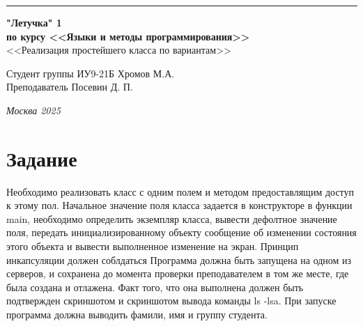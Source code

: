 \documentclass[a4paper, 14pt]{extarticle}
\begin{document}
\begin{titlepage}
\vspace*{-16pt}
\hspace{30pt}\rule{0.866\textwidth}{0.4pt}
  
\vspace{11em}

\begin{center}
\Large {\bf "Летучка" 1} \\ 
\large {\bf по курсу <<Языки и методы программирования>>} \\ 
\large <<Реализация простейшего класса по вариантам>>
\end{center}\normalsize

\vspace{8em}


\begin{flushright}
  {Студент группы ИУ9-21Б Хромов М.А.\hspace*{15pt} \\
  \vspace{2ex}
  Преподаватель Посевин Д. П.\hspace*{15pt}}
\end{flushright}

\bigskip

\vfill
 

\begin{center}
\textsl{Москва 2025}
\end{center}
\end{titlepage}

\renewcommand{\ttdefault}{pcr}

\setlength{\tabcolsep}{3pt}
\newpage


 

\section{Задание}\label{Sect::task}
\par
Необходимо реализовать класс с одним полем и методом предоставлящим доступ к
этому пол. Начальное значение поля класса задается в конструкторе в функции main,
необходимо определить экземпляр класса, вывести дефолтное значение поля, передать
инициализированному объекту сообщение об изменении состояния этого объекта и вывести
выполненное изменение на экран. Принцип инкапсуляции должен соблдаться
Программа должна быть запущена на одном из серверов, и сохранена до момента
проверки преподавателем в том же месте, где была создана и отлажена. Факт того, что она
выполнена должен быть подтвержден скриншотом и скриншотом вывода команды ls -lsa.
При запуске программа должна выводить фамили, имя и группу студента.
\end{document}
